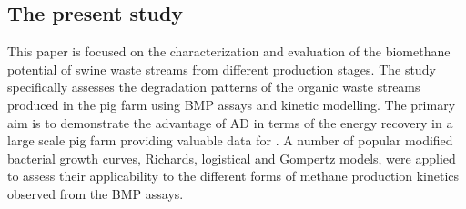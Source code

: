 \subsection{The present study}
This paper is focused on the characterization and evaluation of the biomethane potential of swine waste streams from different production stages. The study specifically assesses the degradation patterns of the organic waste streams produced in the pig farm using BMP assays and kinetic modelling. The primary aim is to demonstrate the advantage of AD in terms of the energy recovery in a large scale pig farm providing valuable data for  . A number of popular modified bacterial growth curves, Richards, logistical and Gompertz models, were applied to assess their applicability to the different forms of methane production kinetics observed from the BMP assays.